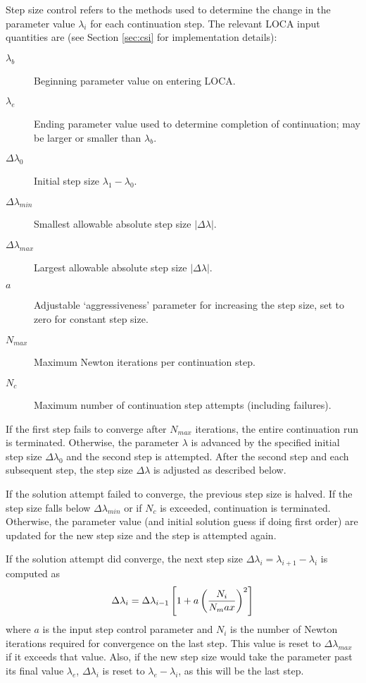 Step size control refers to the methods used to determine the change in the parameter value $\lambda_i$ for each continuation step. The relevant LOCA input quantities are (see Section \ref{sec:csi} for implementation details):

\begin{description}
\item[$\lambda_b$] Beginning parameter value on entering LOCA.

\item[$\lambda_e$] Ending parameter value used to determine completion of continuation; may be larger or smaller than $\lambda_b$.

\item[$\Delta \lambda_0$] Initial step size $\lambda_1 - \lambda_0$.

\item[$\Delta \lambda_{min}$] Smallest allowable absolute step size $|\Delta \lambda|$.

\item[$\Delta \lambda_{max}$] Largest allowable absolute step size $|\Delta \lambda|$.

\item[$a$] Adjustable `aggressiveness' parameter for increasing the step size, set to zero for constant step size.

\item[$N_{max}$] Maximum Newton iterations per continuation step.

\item[$N_c$] Maximum number of continuation step attempts (including failures).
\end{description}

If the first step fails to converge after $N_{max}$ iterations, the entire continuation run is terminated. Otherwise, the parameter $\lambda$ is advanced by the specified initial step size $\Delta \lambda_0$ and the second step is attempted. After the second step and each subsequent step, the step size $\Delta \lambda$ is adjusted as described below.

If the solution attempt failed to converge, the previous step size is halved. If the step size falls below $\Delta \lambda_{min}$ or if $N_c$ is exceeded, continuation is terminated. Otherwise, the parameter value (and initial solution guess if doing first order) are updated for the new step size and the step is attempted again.

If the solution attempt did converge, the next step size $\Delta \lambda_i = \lambda_{i+1} - \lambda_i$ is computed as
\begin{equation}
\label{eq:simplestep}
\Delta \lambda_i = \Delta \lambda_{i-1} \left[ 1 + a \left( {{N_{i}}\over {N_max}} \right)^2 \right]
\end{equation}
where $a$ is the input step control parameter and $N_i$ is the number of Newton iterations required for convergence on the last step. This value is reset to $\Delta \lambda_{max}$ if it exceeds that value. Also, if the new step size would take the parameter past its final value $\lambda_e$, $\Delta \lambda_i$ is reset to $\lambda_e - \lambda_i$, as this will be the last step.

